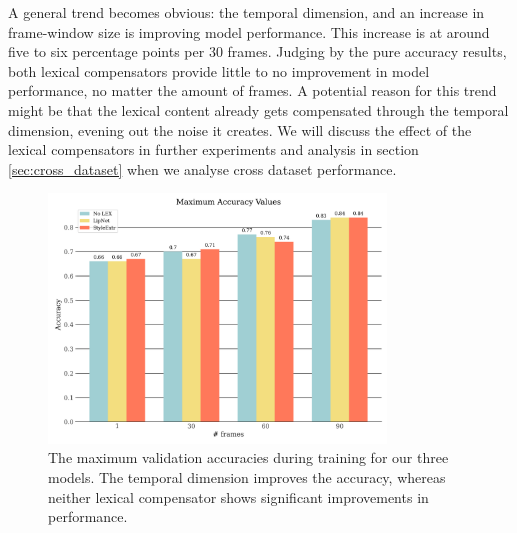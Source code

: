 A general trend becomes obvious: the temporal dimension, and an increase in frame-window size is improving model performance. This increase is at around five to six percentage points per 30 frames. Judging by the pure accuracy results, both lexical compensators provide little to no improvement in model performance, no matter the amount of frames. A potential reason for this trend might be that the lexical content already gets compensated through the temporal dimension, evening out the noise it creates. We will discuss the effect of the lexical compensators in further experiments and analysis in section \ref{sec:cross_dataset} when we analyse cross dataset performance.

\begin{figure}
    \centering
    \includegraphics[width=0.8\textwidth]{res/maxaccvalues.png}
    \caption{The maximum validation accuracies during training for our three models. The temporal dimension improves the accuracy, whereas neither lexical compensator shows significant improvements in performance.}
    \label{fig:max_acc}
\end{figure}

